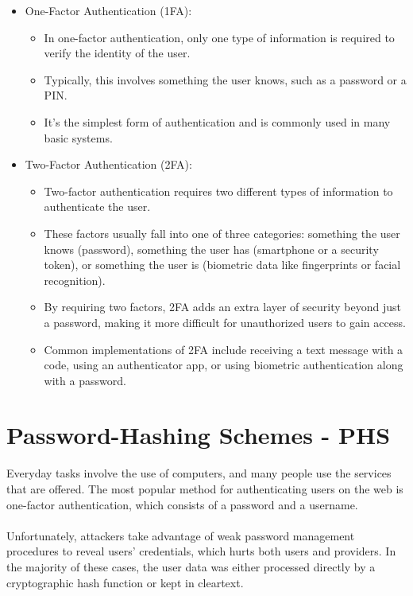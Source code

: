 \documentclass[10pt,oneside,english,a4paper]{article}
\begin{document}
\begin{itemize}
\item One-Factor Authentication (1FA):\\
\begin{itemize}
\item In one-factor authentication, only one type of information is required to verify the identity of the user.
\item Typically, this involves something the user knows, such as a password or a PIN.
\item It's the simplest form of authentication and is commonly used in many basic systems.
\end{itemize}

\item Two-Factor Authentication (2FA):\\
\begin{itemize}
\item Two-factor authentication requires two different types of information to authenticate the user.
\item These factors usually fall into one of three categories: something the user knows (password), something the user has (smartphone or a security token), or something the user is (biometric data like fingerprints or facial recognition).
\item By requiring two factors, 2FA adds an extra layer of security beyond just a password, making it more difficult for unauthorized users to gain access.
\item Common implementations of 2FA include receiving a text message with a code, using an authenticator app, or using biometric authentication along with a password.
\end{itemize}
\end{itemize}


\section{Password-Hashing Schemes - PHS}
Everyday tasks involve the use of computers, and many people use the services that are offered. The most popular method for authenticating users on the web is one-factor authentication, which consists of a password and a username.
\\\\
Unfortunately, attackers take advantage of weak password management procedures to reveal users' credentials, which hurts both users and providers.
In the majority of these cases, the user data was either processed directly by a cryptographic hash function or kept in cleartext.
\end{document}
